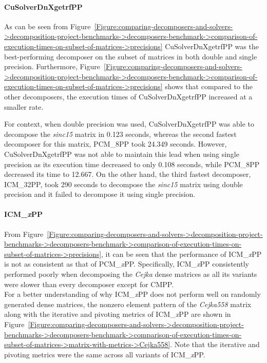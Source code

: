 \paragraph{CuSolverDnXgetrfPP} As can be seen from Figure~\ref{Figure:comparing-decomposers-and-solvers->decomposition-project-benchmarks->decomposers-benchmark->comparison-of-execution-times-on-subset-of-matrices->precisions} CuSolverDnXgetrfPP was the best-performing decomposer on the subset of matrices in both double and single precision. Furthermore, Figure~\ref{Figure:comparing-decomposers-and-solvers->decomposition-project-benchmarks->decomposers-benchmark->comparison-of-execution-times-on-subset-of-matrices->precisions} shows that compared to the other decomposers, the execution times of CuSolverDnXgetrfPP increased at a smaller rate.

For context, when double precision was used, CuSolverDnXgetrfPP was able to decompose the \textit{sinc15} matrix in 0.123 seconds, whereas the second fastest decomposer for this matrix, PCM\_8PP took 24.349 seconds. However, CuSolverDnXgetrfPP was not able to maintain this lead when using single precision as its execution time decreased to only 0.108 seconds, while PCM\_8PP decreased its time to 12.667. On the other hand, the third fastest decomposer, ICM\_32PP, took 290 seconds to decompose the \textit{sinc15} matrix using double precision and it failed to decompose it using single precision.

\paragraph{ICM\_\textit{x}PP} From Figure~\ref{Figure:comparing-decomposers-and-solvers->decomposition-project-benchmarks->decomposers-benchmark->comparison-of-execution-times-on-subset-of-matrices->precisions}, it can be seen that the performance of ICM\_\textit{x}PP is not as consistent as that of PCM\_\textit{x}PP. Specifically, ICM\_\textit{x}PP consistently performed poorly when decomposing the \textit{Cejka} dense matrices as all its variants were slower than every decomposer except for CMPP.\\
For a better understanding of why ICM\_\textit{x}PP does not perform well on randomly generated dense matrices, the nonzero element pattern of the \textit{Cejka558} matrix along with the iterative and pivoting metrics of ICM\_\textit{x}PP are shown in Figure~\ref{Figure:comparing-decomposers-and-solvers->decomposition-project-benchmarks->decomposers-benchmark->comparison-of-execution-times-on-subset-of-matrices->matrix-with-metrics->Cejka558}. Note that the iterative and pivoting metrics were the same across all variants of ICM\_\textit{x}PP.

